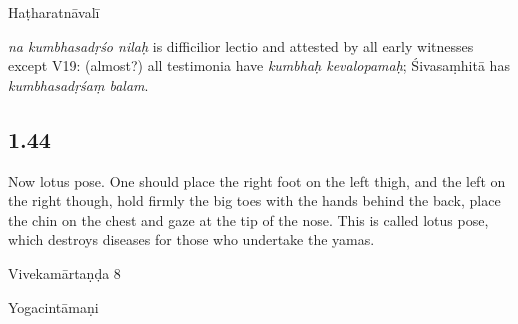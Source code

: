 \begin{ekdosis}
\begin{testimonia}[hp01_043]
Haṭharatnāvalī

\begin{versinnote}
\end{versinnote}

\end{testimonia}

\begin{philcomm}[hp01_043]
\emph{na kumbhasadṛśo nilaḥ} is difficilior lectio and attested by all early witnesses except V19: (almost?) all testimonia have \emph{kumbhaḥ kevalopamaḥ}; Śivasaṃhitā has \emph{kumbhasadṛśaṃ balam}.
\end{philcomm}

\subsection*{1.44}
\begin{translation}[hp01_044]
Now lotus pose.
One should place the right foot on the left thigh, and the left on the right though, hold firmly the big toes with the hands behind the back, place the chin on the chest and gaze at the tip of the nose. This is called lotus pose, which destroys diseases for those who undertake the yamas.
\end{translation}

\begin{sources}[hp01_044]
Vivekamārtaṇḍa 8

\begin{versinnote}
\end{versinnote}

\end{sources}

\begin{testimonia}[hp01_044]
Yogacintāmaṇi

\begin{versinnote}
\end{versinnote}


\end{testimonia}
\end{ekdosis}
